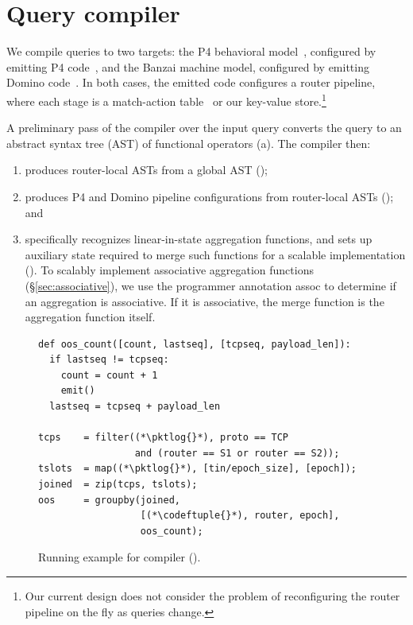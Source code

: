 \section{Query compiler}
\label{sec:compiler}

We compile \TheSystem queries to two targets: the P4 behavioral
model~\cite{p4-bmv2}, configured by emitting P4 code~\cite{p4_16}, and the
Banzai machine model, configured by emitting Domino code~\cite{domino_sigcomm}.
In both cases, the emitted code configures a router pipeline, where each stage
is a match-action table~\cite{rmt} or our key-value
store.\footnote{Our current design does not consider the problem of reconfiguring
the router pipeline on the fly as queries change.}

A preliminary pass of the compiler over the input query converts the query to an
abstract syntax tree (AST) of functional operators (a). The compiler then:
\begin{enumerate}
\item produces router-local ASTs from a global AST
  ();
\item produces P4 and Domino pipeline configurations from router-local ASTs
  (); and
\item specifically recognizes linear-in-state aggregation functions, and sets up
  auxiliary state required to merge such functions for a scalable implementation
  (). To scalably implement associative
  aggregation functions (\S\ref{sec:associative}), we use the programmer
  annotation {\ct assoc} to determine if an aggregation is associative. If it is
  associative, the merge function is the aggregation function itself.
\end{enumerate}

\begin{figure}[!t]{
\figcodesize
\begin{lstlisting}
def oos_count([count, lastseq], [tcpseq, payload_len]):
  if lastseq != tcpseq:
    count = count + 1
    emit()
  lastseq = tcpseq + payload_len

tcps    = filter((*\pktlog{}*), proto == TCP
                 and (router == S1 or router == S2));
tslots  = map((*\pktlog{}*), [tin/epoch_size], [epoch]);
joined  = zip(tcps, tslots);
oos     = groupby(joined,
                  [(*\codeftuple{}*), router, epoch],
                  oos_count);
\end{lstlisting}
}
\caption{Running example for \TheSystem compiler ().}
\label{fig:running-example-code}
\end{figure}

